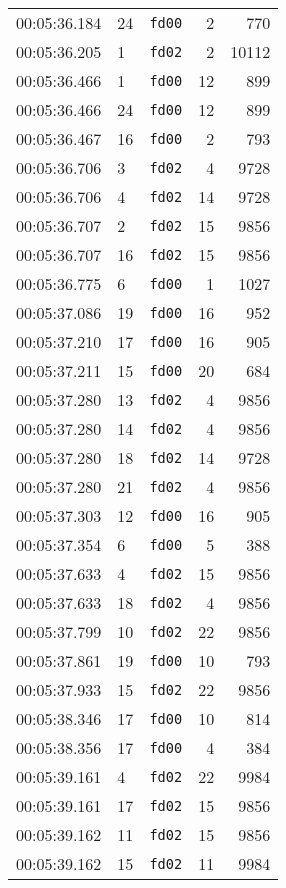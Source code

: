 \documentclass{article}
\begin{document}
\begin{longtable}{lllrr}
00:05:36.184 & 24 & \texttt{fd00} & 2 & 770 \\
00:05:36.205 & 1 & \texttt{fd02} & 2 & 10112 \\
00:05:36.466 & 1 & \texttt{fd00} & 12 & 899 \\
00:05:36.466 & 24 & \texttt{fd00} & 12 & 899 \\
00:05:36.467 & 16 & \texttt{fd00} & 2 & 793 \\
00:05:36.706 & 3 & \texttt{fd02} & 4 & 9728 \\
00:05:36.706 & 4 & \texttt{fd02} & 14 & 9728 \\
00:05:36.707 & 2 & \texttt{fd02} & 15 & 9856 \\
00:05:36.707 & 16 & \texttt{fd02} & 15 & 9856 \\
00:05:36.775 & 6 & \texttt{fd00} & 1 & 1027 \\
00:05:37.086 & 19 & \texttt{fd00} & 16 & 952 \\
00:05:37.210 & 17 & \texttt{fd00} & 16 & 905 \\
00:05:37.211 & 15 & \texttt{fd00} & 20 & 684 \\
00:05:37.280 & 13 & \texttt{fd02} & 4 & 9856 \\
00:05:37.280 & 14 & \texttt{fd02} & 4 & 9856 \\
00:05:37.280 & 18 & \texttt{fd02} & 14 & 9728 \\
00:05:37.280 & 21 & \texttt{fd02} & 4 & 9856 \\
00:05:37.303 & 12 & \texttt{fd00} & 16 & 905 \\
00:05:37.354 & 6 & \texttt{fd00} & 5 & 388 \\
00:05:37.633 & 4 & \texttt{fd02} & 15 & 9856 \\
00:05:37.633 & 18 & \texttt{fd02} & 4 & 9856 \\
00:05:37.799 & 10 & \texttt{fd02} & 22 & 9856 \\
00:05:37.861 & 19 & \texttt{fd00} & 10 & 793 \\
00:05:37.933 & 15 & \texttt{fd02} & 22 & 9856 \\
00:05:38.346 & 17 & \texttt{fd00} & 10 & 814 \\
00:05:38.356 & 17 & \texttt{fd00} & 4 & 384 \\
00:05:39.161 & 4 & \texttt{fd02} & 22 & 9984 \\
00:05:39.161 & 17 & \texttt{fd02} & 15 & 9856 \\
00:05:39.162 & 11 & \texttt{fd02} & 15 & 9856 \\
00:05:39.162 & 15 & \texttt{fd02} & 11 & 9984 \\

\end{longtable}
\end{document}
